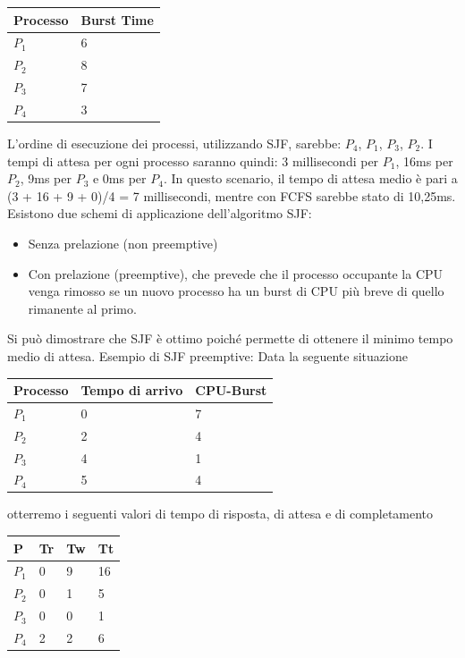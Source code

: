 \documentclass[a4paper]{article}
\begin{document}
\begin{table}[h!]
    \centering
    \label{my-label}
    \begin{tabular}{ll}
        Processo & Burst Time \\ \hline
        $P_1$    & 6          \\
        $P_2$    & 8          \\
        $P_3$    & 7          \\
        $P_4$    & 3
    \end{tabular}
\end{table}

L'ordine di esecuzione dei processi, utilizzando SJF, sarebbe: $P_4$, $P_1$, $P_3$, $P_2$. I tempi di attesa per ogni processo saranno quindi: 3 millisecondi per $P_1$, 16ms per $P_2$, 9ms per $P_3$ e 0ms per $P_4$. In questo scenario, il tempo di attesa medio è pari a (3 + 16 + 9 + 0)/4 = 7 millisecondi, mentre con FCFS sarebbe stato di 10,25ms. \newline
Esistono due schemi di applicazione dell'algoritmo SJF:
\begin{itemize}
\item Senza prelazione (non preemptive)
\item Con prelazione (preemptive), che prevede che il processo occupante la CPU venga rimosso se un nuovo processo ha un burst di CPU più breve di quello rimanente al primo.
\end {itemize}
Si può dimostrare che SJF è ottimo poiché permette di ottenere il minimo tempo medio di attesa.
Esempio di SJF preemptive:\newline
Data la seguente situazione
\begin{table}[h!]
    \centering
    \label{my-label}
    \begin{tabular}{lll}
        Processo & Tempo di arrivo & CPU-Burst \\ \hline
        $P_1$    & 0               & 7         \\
        $P_2$    & 2               & 4         \\
        $P_3$    & 4               & 1         \\
        $P_4$    & 5               & 4
    \end{tabular}
\end{table}

otterremo i seguenti valori di tempo di risposta, di attesa e di completamento

\begin{table}[h!]
    \centering
    \label{my-label}
    \begin{tabular}{llll}
        P     & Tr & Tw & Tt \\ \hline
        $P_1$ & 0  & 9  & 16 \\
        $P_2$ & 0  & 1  & 5  \\
        $P_3$ & 0  & 0  & 1  \\
        $P_4$ & 2  & 2  & 6
    \end{tabular}
\end{table}
\end{document}
